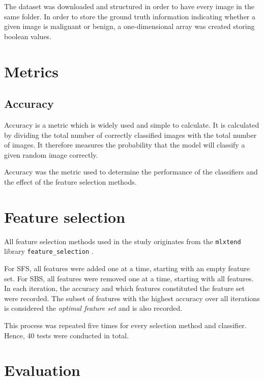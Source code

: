 \documentclass{kththesis}
\begin{document}
The dataset was downloaded and structured in order to have every image in the same folder. In order to store the ground truth information indicating whether a given image is malignant or benign, a one-dimensional array was created storing boolean values.

\section{Metrics}

\subsection{Accuracy}

Accuracy is a metric which is widely used and simple to calculate.
It is calculated by dividing the total number of correctly classified images with the total number of images. 
It therefore measures the probability that the model will classify a given random image correctly. \parencite{takiddin2021artificial}

Accuracy was the metric used to determine the performance of the classifiers and the effect of the feature selection methods.


\section{Feature selection}

All feature selection methods used in the study originates from the \verb|mlxtend| library \verb|feature_selection| \parencite{raschkas_2018_mlxtend}.

For SFS, all features were added one at a time, starting with an empty feature set. For SBS, all features were removed one at a time, starting with all features. In each iteration, the accuracy and which features constituted the feature set were recorded. The subset of features with the highest accuracy over all iterations is considered the \emph{optimal feature set} and is also recorded.

This process was repeated five times for every selection method and classifier. Hence, 40 tests were conducted in total.


\section{Evaluation}
\end{document}
